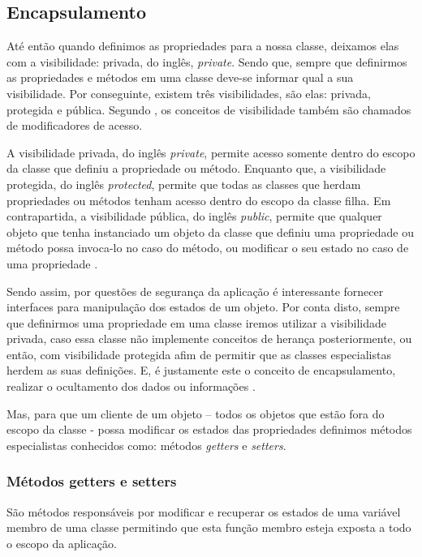 \subsection{Encapsulamento}

Até então quando definimos as propriedades para a nossa classe, deixamos elas
com a visibilidade: privada, do inglês, \textit{private}. Sendo que, sempre que
definirmos as propriedades e métodos em uma classe deve-se informar qual a  sua
visibilidade. Por conseguinte, existem três visibilidades, são elas: privada,
protegida e pública. Segundo , os conceitos de
visibilidade também são chamados de modificadores de acesso.

A visibilidade privada, do inglês \textit{private}, permite acesso somente
dentro do escopo da classe que definiu a propriedade ou método. Enquanto que, a
visibilidade protegida, do inglês \textit{protected}, permite que todas as
classes  que herdam propriedades ou métodos tenham acesso dentro do escopo da classe filha.
Em contrapartida, a visibilidade pública, do inglês \textit{public}, permite que
qualquer objeto que tenha instanciado um objeto da classe que definiu uma propriedade ou
método possa invoca-lo no caso do método, ou modificar o seu estado no caso de
uma propriedade \cite{learningJava}.

Sendo assim, por questões de segurança da aplicação é interessante fornecer
interfaces para manipulação dos estados de um objeto. Por conta disto,  sempre
que definirmos uma propriedade em uma classe iremos utilizar a visibilidade
privada, caso essa classe não implemente conceitos de herança posteriormente,
ou então, com visibilidade protegida afim de permitir que as classes
especialistas herdem as suas definições. E, é justamente este o conceito de
encapsulamento, realizar o ocultamento dos dados ou informações \cite{javaComoProgramar}.

Mas, para que um cliente de um objeto – todos os objetos que estão fora do
escopo da classe -  possa modificar os estados das propriedades definimos
métodos especialistas conhecidos como: métodos \textit{getters} e
\textit{setters}.

\subsubsection{Métodos getters e setters}

São métodos responsáveis por modificar e recuperar os estados de uma variável
membro de uma classe permitindo que esta função membro esteja exposta a todo o
escopo da aplicação.

